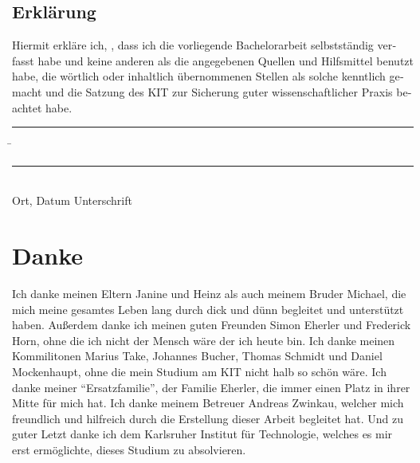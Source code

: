 \documentclass[parskip=full,12pt,a4paper,twoside,headings=openright]{scrreprt}
\begin{document}



\begin{otherlanguage}{ngerman}
\chapter*{Erklärung}
\pagestyle{empty}

  \vspace{20mm}
  Hiermit erkläre ich, \theauthor, dass ich die vorliegende Bachelorarbeit selbst\-ständig
verfasst habe und keine anderen als die angegebenen Quellen und Hilfsmittel
benutzt habe, die wörtlich oder inhaltlich übernommenen Stellen als solche kenntlich gemacht und
die Satzung des KIT zur Sicherung guter wissenschaftlicher Praxis beachtet habe.
  \vspace{20mm}
  \begin{tabbing}
  \rule{4cm}{.4pt}\hspace{1cm} \= \rule{7cm}{.4pt} \\
 Ort, Datum \> Unterschrift
  \end{tabbing}
\end{otherlanguage}

\chapter*{Danke}
\pagestyle{empty}

Ich danke meinen Eltern Janine und Heinz als auch meinem Bruder Michael, die mich meine gesamtes Leben lang durch dick und dünn
begleitet und unterstützt haben. Außerdem danke ich meinen guten Freunden Simon Eherler und Frederick Horn, ohne die ich nicht der
Mensch wäre der ich heute bin. Ich danke meinen Kommilitonen Marius Take, Johannes Bucher, Thomas Schmidt und Daniel Mockenhaupt,
ohne die mein Studium am KIT nicht halb so schön wäre. Ich danke meiner "`Ersatzfamilie"', der Familie Eherler,
die immer einen Platz in ihrer Mitte für mich hat. Ich danke meinem Betreuer Andreas Zwinkau, welcher
mich freundlich und hilfreich durch die Erstellung dieser Arbeit begleitet hat. Und zu guter Letzt
danke ich dem Karlsruher Institut für Technologie, welches es mir erst ermöglichte, dieses Studium zu absolvieren.

\pagestyle{fancy}
\appendix

%
\end{document}

